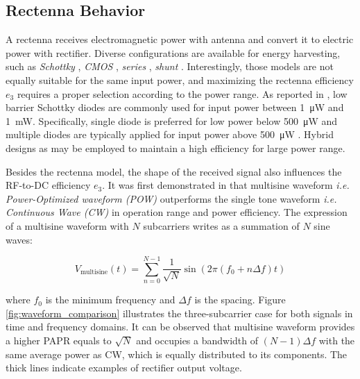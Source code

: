 \subsection{Rectenna Behavior}\label{sec:rectenna-behavior}

A rectenna receives electromagnetic power with antenna and convert it to electric power with rectifier. Diverse configurations are available for energy harvesting, such as \textit{Schottky} \cite{Akkermans2005, Boaventura2013}, \textit{CMOS} \cite{Stoopman2014, Valenta2014}, \textit{series} \cite{Georgiadis2011, Collado2013}, \textit{shunt} \cite{McSpadden1998, Guo2012}. Interestingly, those models are not equally suitable for the same input power, and maximizing the rectenna efficiency ${e_3}$ requires a proper selection according to the power range. As reported in \cite{Valenta2014, Costanzo2016}, low barrier Schottky diodes are commonly used for input power between \SI{1}{\uW} and \SI{1}{\mW}. Specifically, single diode is preferred for low power below \SI{500}{\uW} and multiple diodes are typically applied for input power above \SI{500}{\uW} \cite{Clerckx2019}. Hybrid designs as \cite{Sun2013} may be employed to maintain a high efficiency for large power range.

Besides the rectenna model, the shape of the received signal also influences the RF-to-DC efficiency ${e_3}$. It was first demonstrated in \cite{Trotter2009} that multisine waveform \textit{i.e. Power-Optimized waveform (POW)} outperforms the single tone waveform \textit{i.e. Continuous Wave (CW)} in operation range and power efficiency. The expression of a multisine waveform with $N$ subcarriers writes as a summation of $N$ sine waves:

\begin{equation}\label{eqn:multisine}
  {V_{{\text{multisine}}}}(t) = \sum\limits_{n = 0}^{N - 1} {\frac{1}{{\sqrt N }}} \sin \left( {2\pi \left( {{f_{\text{0}}} + n\Delta f} \right)t} \right)
\end{equation}

where ${{f_{\text{0}}}}$ is the minimum frequency and ${\Delta f}$ is the spacing. Figure \ref{fig:waveform_comparison} \cite{Trotter2009} illustrates the three-subcarrier case for both signals in time and frequency domains. It can be observed that multisine waveform provides a higher PAPR equals to ${\sqrt N }$ and occupies a bandwidth of $(N - 1) \Delta f$ with the same average power as CW, which is equally distributed to its components. The thick lines indicate examples of rectifier output voltage.

